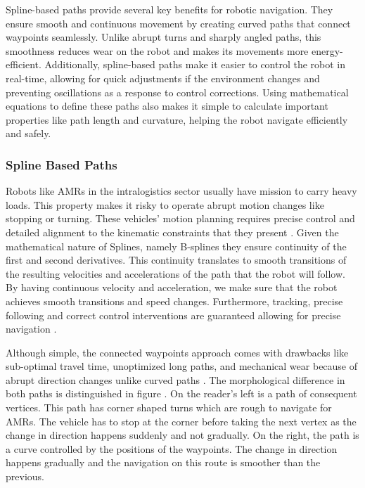 Spline-based paths provide several key benefits for robotic navigation. They ensure smooth and continuous movement by 
creating curved paths that connect waypoints seamlessly. Unlike abrupt turns and sharply angled paths, this smoothness 
reduces wear on the robot and makes its movements more energy-efficient. Additionally, spline-based paths make it 
easier to control the robot in real-time, allowing for quick adjustments if the environment changes and preventing 
oscillations as a response to control corrections. Using mathematical 
equations to define these paths also makes it simple to calculate important 
properties like path length and curvature, helping the robot navigate efficiently and safely. 

\subsubsection{Spline Based Paths}
Robots like AMRs in the intralogistics sector usually have mission to carry heavy loads. 
This property makes it risky to operate abrupt motion changes like stopping or turning.
These vehicles' motion planning requires precise control and detailed alignment to the 
kinematic constraints that they present \cite{R30}.
Given the mathematical nature of Splines, namely B-splines they ensure continuity of 
the first and second derivatives.
This continuity translates to smooth transitions of the resulting velocities and accelerations of the path
that the robot will follow. By having continuous velocity and acceleration, we make sure that the robot
achieves smooth transitions and speed changes. Furthermore, tracking, precise following and correct control
interventions are guaranteed allowing for precise navigation \cite{R30}. 

 
Although simple,
the connected waypoints approach comes with drawbacks like sub-optimal travel time, unoptimized long paths, 
and mechanical wear because of abrupt direction changes unlike curved paths \cite{R30}. The morphological 
difference in both paths is distinguished in figure . 
On the reader's left is a path of consequent vertices. This path has corner shaped turns which are rough to 
navigate for AMRs. The vehicle has to stop at the corner before taking the next vertex 
as the change in direction happens suddenly and not gradually.
On the right, the path is a curve controlled by the positions of the waypoints. 
The change in direction happens gradually and the navigation on this route is smoother than the previous.

